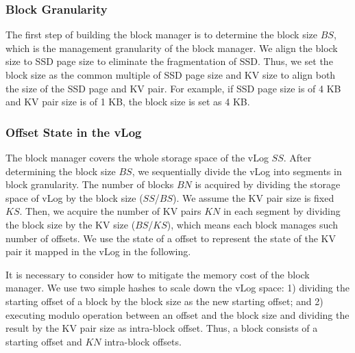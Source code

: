 \documentclass[sigconf]{acmart}
\begin{document}
\subsubsection{Block Granularity}
The first step of building the block manager is to determine the block size $BS$, which is the management granularity of the block manager. We align the block size to SSD page size to eliminate the fragmentation of SSD. Thus, we set the block size as the common multiple of SSD page size and KV size to align both the size of the SSD page and KV pair. For example, if SSD page size is of 4 KB and KV pair size is of 1 KB, the block size is set as 4 KB. 

\subsubsection{Offset State in the vLog}
The block manager covers the whole storage space of the vLog $SS$. After determining the block size $BS$, we sequentially divide the vLog into segments in block granularity. The number of blocks $BN$ is acquired by dividing the storage space of vLog by the block size ($SS$/$BS$). We assume the KV pair size is fixed $KS$. Then, we acquire the number of KV pairs $KN$ in each segment by dividing the block size by the KV size ($BS$/$KS$), which means each block manages such number of offsets. We use the state of a offset to represent the state of the KV pair it mapped in the vLog in the following.

It is necessary to consider how to mitigate the memory cost of the block manager. We use two simple hashes to scale down the vLog space: 1) dividing the starting offset of a block by the block size as the new starting offset; and 2) executing modulo operation between an offset and the block size and dividing the result by the KV pair size as intra-block offset. Thus, a block consists of a starting offset and $KN$ intra-block offsets.
\end{document}
